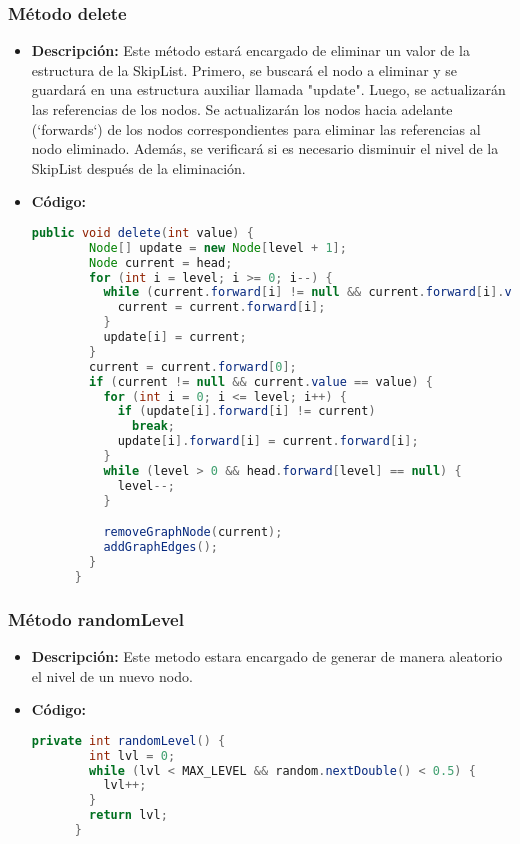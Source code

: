\documentclass{article}
\begin{document}

  \subsubsection{Método delete}
  \begin{itemize}
    \item \textbf{Descripción: }Este método estará encargado de eliminar un valor de la estructura de la SkipList. Primero, 
    se buscará el nodo a eliminar y se guardará en una estructura auxiliar llamada "update". Luego, se actualizarán las 
    referencias de los nodos. Se actualizarán los nodos hacia adelante (`forwards`) de los nodos correspondientes para eliminar 
    las referencias al nodo eliminado. Además, se verificará si es necesario disminuir el nivel de la SkipList después de la eliminación.

    \item \textbf{Código: }
    \begin{lstlisting}[language=Java, caption={Método delete}]
      public void delete(int value) {
        Node[] update = new Node[level + 1];
        Node current = head;
        for (int i = level; i >= 0; i--) {
          while (current.forward[i] != null && current.forward[i].value < value) {
            current = current.forward[i];
          }
          update[i] = current;
        }
        current = current.forward[0];
        if (current != null && current.value == value) {
          for (int i = 0; i <= level; i++) {
            if (update[i].forward[i] != current)
              break;
            update[i].forward[i] = current.forward[i];
          }
          while (level > 0 && head.forward[level] == null) {
            level--;
          }

          removeGraphNode(current);
          addGraphEdges();
        }
      }
    \end{lstlisting}
  \end{itemize}
  

  \subsubsection{Método randomLevel}
  \begin{itemize}
    \item \textbf{Descripción: }Este metodo estara encargado de generar de manera aleatorio el nivel de un nuevo nodo.
    \item \textbf{Código: }
    \begin{lstlisting}[language=Java, caption={Método randomLevel}]
      private int randomLevel() {
        int lvl = 0;
        while (lvl < MAX_LEVEL && random.nextDouble() < 0.5) {
          lvl++;
        }
        return lvl;
      }
    \end{lstlisting}
  \end{itemize}
  
\end{document}
